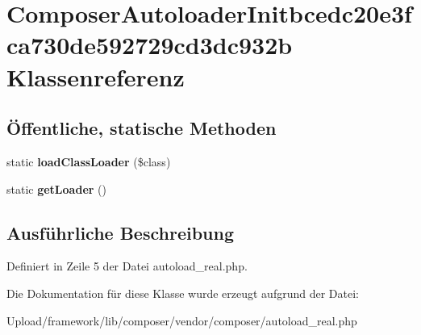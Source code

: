 \hypertarget{class_composer_autoloader_initbcedc20e3fca730de592729cd3dc932b}{}\section{Composer\+Autoloader\+Initbcedc20e3fca730de592729cd3dc932b Klassenreferenz}
\label{class_composer_autoloader_initbcedc20e3fca730de592729cd3dc932b}
\subsection*{Öffentliche, statische Methoden}
\begin{DoxyCompactItemize}
\item 
\mbox{\label{class_composer_autoloader_initbcedc20e3fca730de592729cd3dc932b_af485fd449ac99492407b9fac6bbc72fe}} 
static {\bfseries load\+Class\+Loader} (\$class)
\item 
\mbox{\label{class_composer_autoloader_initbcedc20e3fca730de592729cd3dc932b_ac188fd1762ddec9974b4a16d99f89f4e}} 
static {\bfseries get\+Loader} ()
\end{DoxyCompactItemize}


\subsection{Ausführliche Beschreibung}


Definiert in Zeile 5 der Datei autoload\+\_\+real.\+php.



Die Dokumentation für diese Klasse wurde erzeugt aufgrund der Datei\+:\begin{DoxyCompactItemize}
\item 
Upload/framework/lib/composer/vendor/composer/autoload\+\_\+real.\+php\end{DoxyCompactItemize}

